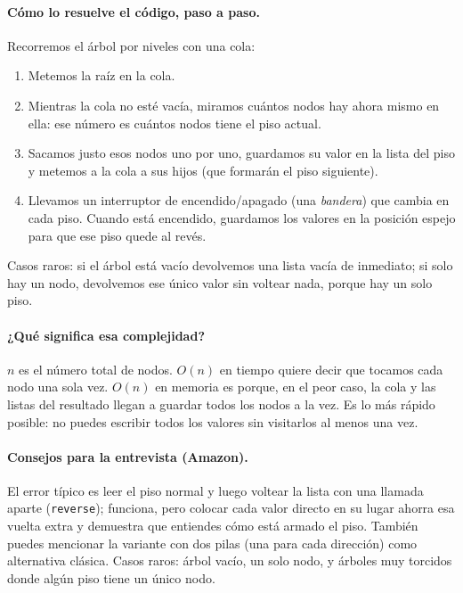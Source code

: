 \paragraph{Cómo lo resuelve el código, paso a paso.} Recorremos el árbol por
niveles con una cola:
\begin{enumerate}
  \item Metemos la raíz en la cola.
  \item Mientras la cola no esté vacía, miramos cuántos nodos hay ahora mismo en
        ella: ese número es cuántos nodos tiene el piso actual.
  \item Sacamos justo esos nodos uno por uno, guardamos su valor en la lista del
        piso y metemos a la cola a sus hijos (que formarán el piso siguiente).
  \item Llevamos un interruptor de encendido/apagado (una \emph{bandera}) que
        cambia en cada piso. Cuando está encendido, guardamos los valores en la
        posición espejo para que ese piso quede al revés.
\end{enumerate}
Casos raros: si el árbol está vacío devolvemos una lista vacía de inmediato; si
solo hay un nodo, devolvemos ese único valor sin voltear nada, porque hay un
solo piso.




\paragraph{¿Qué significa esa complejidad?} $n$ es el número total de nodos.
$O(n)$ en tiempo quiere decir que tocamos cada nodo una sola vez. $O(n)$ en
memoria es porque, en el peor caso, la cola y las listas del resultado llegan a
guardar todos los nodos a la vez. Es lo más rápido posible: no puedes escribir
todos los valores sin visitarlos al menos una vez.

\paragraph{Consejos para la entrevista (Amazon).} El error típico es leer el
piso normal y luego voltear la lista con una llamada aparte (\texttt{reverse});
funciona, pero colocar cada valor directo en su lugar ahorra esa vuelta extra y
demuestra que entiendes cómo está armado el piso. También puedes mencionar la
variante con dos pilas (una para cada dirección) como alternativa clásica.
Casos raros: árbol vacío, un solo nodo, y árboles muy torcidos donde algún piso
tiene un único nodo.
